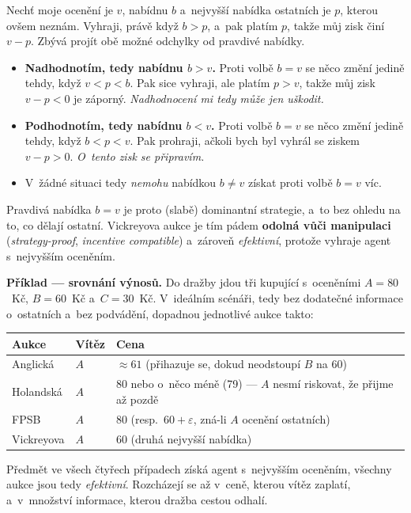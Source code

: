 \documentclass[11pt,a4paper]{article}
\theoremstyle{definition}
\begin{document}
\begin{defbox}
Nechť moje ocenění je $v$, nabídnu $b$ a~nejvyšší nabídka ostatních je $p$, kterou ovšem neznám.
Vyhraji, právě když $b > p$, a~pak platím $p$, takže můj zisk činí $v - p$. Zbývá projít obě
možné odchylky od pravdivé nabídky.
\begin{itemize}
\item \textbf{Nadhodnotím, tedy nabídnu $b > v$.} Proti volbě $b=v$ se něco změní jedině tehdy,
  když $v < p < b$. Pak sice vyhraji, ale platím $p > v$, takže můj zisk $v - p < 0$ je záporný.
  \emph{Nadhodnocení mi tedy může jen uškodit.}
\item \textbf{Podhodnotím, tedy nabídnu $b < v$.} Proti volbě $b=v$ se něco změní jedině tehdy,
  když $b < p < v$. Pak prohraji, ačkoli bych byl vyhrál se ziskem $v - p > 0$.
  \emph{O~tento zisk se připravím.}
\item V~žádné situaci tedy \emph{nemohu} nabídkou $b \ne v$ získat proti volbě $b = v$ víc.
\end{itemize}
Pravdivá nabídka $b = v$ je proto (slabě) dominantní strategie, a~to bez ohledu na to, co dělají
ostatní. Vickreyova aukce je tím pádem \textbf{odolná vůči manipulaci} (\emph{strategy-proof},
\emph{incentive compatible}) a~zároveň \emph{efektivní}, protože vyhraje agent s~nejvyšším
oceněním.
\end{defbox}

\medskip
\noindent\textbf{Příklad --- srovnání výnosů.} Do dražby jdou tři kupující s~oceněními
$A = 80$~Kč, $B = 60$~Kč a~$C = 30$~Kč. V~ideálním scénáři, tedy bez dodatečné informace
o~ostatních a~bez podvádění, dopadnou jednotlivé aukce takto:
\begin{center}\small
\begin{tabular}{lll}
\toprule
\textbf{Aukce} & \textbf{Vítěz} & \textbf{Cena} \\
\midrule
Anglická & $A$ & $\approx 61$ (přihazuje se, dokud neodstoupí $B$ na 60) \\
Holandská & $A$ & $80$ nebo o~něco méně (79) --- $A$ nesmí riskovat, že přijme až pozdě \\
FPSB & $A$ & $80$ (resp.\ $60+\varepsilon$, zná-li $A$ ocenění ostatních) \\
Vickreyova & $A$ & $60$ (druhá nejvyšší nabídka) \\
\bottomrule
\end{tabular}
\end{center}
Předmět ve všech čtyřech případech získá agent s~nejvyšším oceněním, všechny aukce jsou tedy
\emph{efektivní}. Rozcházejí se až v~ceně, kterou vítěz zaplatí, a~v~množství informace, kterou
dražba cestou odhalí.
\end{document}
